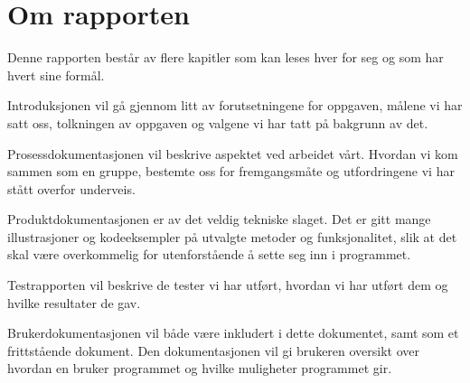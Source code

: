 \section{Om rapporten}
Denne rapporten består av flere kapitler som kan leses hver for seg og som har hvert sine formål.

Introduksjonen vil gå gjennom litt av forutsetningene for oppgaven, målene vi har satt oss, tolkningen av oppgaven og valgene vi har tatt på bakgrunn av det. 

Prosessdokumentasjonen vil beskrive aspektet ved arbeidet vårt. Hvordan vi kom sammen som en gruppe, bestemte oss for fremgangsmåte og utfordringene vi har stått overfor underveis.

Produktdokumentasjonen er av det veldig tekniske slaget. Det er gitt mange illustrasjoner og kodeeksempler på utvalgte metoder og funksjonalitet, slik at det skal være overkommelig for utenforstående å sette seg inn i programmet.

Testrapporten vil beskrive de tester vi har utført, hvordan vi har utført dem og hvilke resultater de gav. 

Brukerdokumentasjonen vil både være inkludert i dette dokumentet, samt som et frittstående dokument. Den dokumentasjonen vil gi brukeren oversikt over hvordan en bruker programmet og hvilke muligheter programmet gir.
